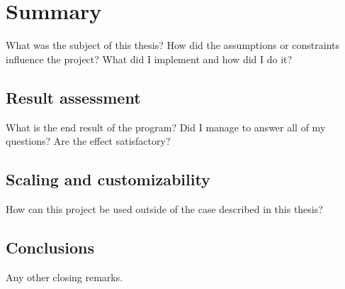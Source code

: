 \chapter{Summary}
\label{ch:summary}
What was the subject of this thesis?
How did the assumptions or constraints influence the project?
What did I implement and how did I do it?


\section{Result assessment}
What is the end result of the program?
Did I manage to answer all of my questions?
Are the effect satisfactory?


\section{Scaling and customizability}
How can this project be used outside of the case described in this thesis?


\section{Conclusions}
Any other closing remarks.